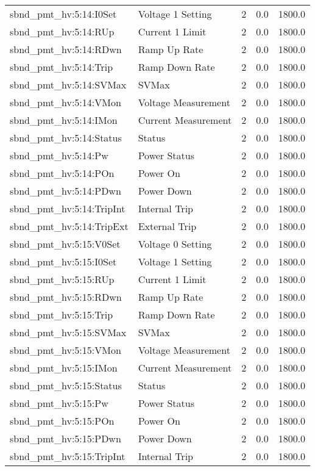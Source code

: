 \begin{center}
\begin{longtable}{l | l l l l }
sbnd\_pmt\_hv:5:14:I0Set & Voltage 1 Setting & 2 & 0.0 & 1800.0\\ 
sbnd\_pmt\_hv:5:14:RUp & Current 1 Limit & 2 & 0.0 & 1800.0\\ 
sbnd\_pmt\_hv:5:14:RDwn & Ramp Up Rate & 2 & 0.0 & 1800.0\\ 
sbnd\_pmt\_hv:5:14:Trip & Ramp Down Rate & 2 & 0.0 & 1800.0\\ 
sbnd\_pmt\_hv:5:14:SVMax & SVMax & 2 & 0.0 & 1800.0\\ 
sbnd\_pmt\_hv:5:14:VMon & Voltage Measurement & 2 & 0.0 & 1800.0\\ 
sbnd\_pmt\_hv:5:14:IMon & Current Measurement & 2 & 0.0 & 1800.0\\ 
sbnd\_pmt\_hv:5:14:Status & Status & 2 & 0.0 & 1800.0\\ 
sbnd\_pmt\_hv:5:14:Pw & Power Status & 2 & 0.0 & 1800.0\\ 
sbnd\_pmt\_hv:5:14:POn & Power On & 2 & 0.0 & 1800.0\\ 
sbnd\_pmt\_hv:5:14:PDwn & Power Down & 2 & 0.0 & 1800.0\\ 
sbnd\_pmt\_hv:5:14:TripInt & Internal Trip & 2 & 0.0 & 1800.0\\ 
sbnd\_pmt\_hv:5:14:TripExt & External Trip & 2 & 0.0 & 1800.0\\ 
sbnd\_pmt\_hv:5:15:V0Set & Voltage 0 Setting & 2 & 0.0 & 1800.0\\ 
sbnd\_pmt\_hv:5:15:I0Set & Voltage 1 Setting & 2 & 0.0 & 1800.0\\ 
sbnd\_pmt\_hv:5:15:RUp & Current 1 Limit & 2 & 0.0 & 1800.0\\ 
sbnd\_pmt\_hv:5:15:RDwn & Ramp Up Rate & 2 & 0.0 & 1800.0\\ 
sbnd\_pmt\_hv:5:15:Trip & Ramp Down Rate & 2 & 0.0 & 1800.0\\ 
sbnd\_pmt\_hv:5:15:SVMax & SVMax & 2 & 0.0 & 1800.0\\ 
sbnd\_pmt\_hv:5:15:VMon & Voltage Measurement & 2 & 0.0 & 1800.0\\ 
sbnd\_pmt\_hv:5:15:IMon & Current Measurement & 2 & 0.0 & 1800.0\\ 
sbnd\_pmt\_hv:5:15:Status & Status & 2 & 0.0 & 1800.0\\ 
sbnd\_pmt\_hv:5:15:Pw & Power Status & 2 & 0.0 & 1800.0\\ 
sbnd\_pmt\_hv:5:15:POn & Power On & 2 & 0.0 & 1800.0\\ 
sbnd\_pmt\_hv:5:15:PDwn & Power Down & 2 & 0.0 & 1800.0\\ 
sbnd\_pmt\_hv:5:15:TripInt & Internal Trip & 2 & 0.0 & 1800.0\\ 

\end{longtable}
\end{center}
